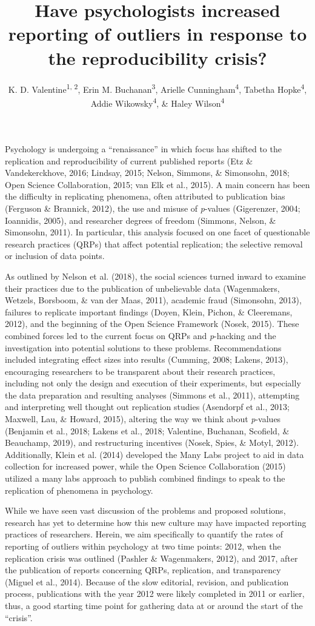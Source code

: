 \documentclass[english,,man,mask]{apa6}
\title{Have psychologists increased reporting of outliers in response to the
reproducibility crisis?}
\author{K. D. Valentine\textsuperscript{1, 2}, Erin M.
Buchanan\textsuperscript{3}, Arielle Cunningham\textsuperscript{4},
Tabetha Hopke\textsuperscript{4}, Addie Wikowsky\textsuperscript{4}, \&
Haley Wilson\textsuperscript{4}}
\date{}
\affiliation{
\vspace{0.5cm}
\textsuperscript{1} Massachusetts General Hospital\\\textsuperscript{2} Harvard Medical School\\\textsuperscript{3} Harrisburg University of Science and Technology\\\textsuperscript{4} Missouri State University}
\theoremstyle{definition}
\theoremstyle{definition}
\theoremstyle{definition}
\theoremstyle{remark}
\begin{document}
\maketitle

Psychology is undergoing a \enquote{renaissance} in which focus has
shifted to the replication and reproducibility of current published
reports (Etz \& Vandekerckhove, 2016; Lindsay, 2015; Nelson, Simmons, \&
Simonsohn, 2018; Open Science Collaboration, 2015; van Elk et al.,
2015). A main concern has been the difficulty in replicating phenomena,
often attributed to publication bias (Ferguson \& Brannick, 2012), the
use and misuse of \emph{p}-values (Gigerenzer, 2004; Ioannidis, 2005),
and researcher degrees of freedom (Simmons, Nelson, \& Simonsohn, 2011).
In particular, this analysis focused on one facet of questionable
research practices (QRPs) that affect potential replication; the
selective removal or inclusion of data points.

As outlined by Nelson et al. (2018), the social sciences turned inward
to examine their practices due to the publication of unbelievable data
(Wagenmakers, Wetzels, Borsboom, \& van der Maas, 2011), academic fraud
(Simonsohn, 2013), failures to replicate important findings (Doyen,
Klein, Pichon, \& Cleeremans, 2012), and the beginning of the Open
Science Framework (Nosek, 2015). These combined forces led to the
current focus on QRPs and \emph{p}-hacking and the investigation into
potential solutions to these problems. Recommendations included
integrating effect sizes into results (Cumming, 2008; Lakens, 2013),
encouraging researchers to be transparent about their research
practices, including not only the design and execution of their
experiments, but especially the data preparation and resulting analyses
(Simmons et al., 2011), attempting and interpreting well thought out
replication studies (Asendorpf et al., 2013; Maxwell, Lau, \& Howard,
2015), altering the way we think about \emph{p}-values (Benjamin et al.,
2018; Lakens et al., 2018; Valentine, Buchanan, Scofield, \& Beauchamp,
2019), and restructuring incentives (Nosek, Spies, \& Motyl, 2012).
Additionally, Klein et al. (2014) developed the Many Labs project to aid
in data collection for increased power, while the Open Science
Collaboration (2015) utilized a many labs approach to publish combined
findings to speak to the replication of phenomena in psychology.

While we have seen vast discussion of the problems and proposed
solutions, research has yet to determine how this new culture may have
impacted reporting practices of researchers. Herein, we aim specifically
to quantify the rates of reporting of outliers within psychology at two
time points: 2012, when the replication crisis was outlined (Pashler \&
Wagenmakers, 2012), and 2017, after the publication of reports
concerning QRPs, replication, and transparency (Miguel et al., 2014).
Because of the slow editorial, revision, and publication process,
publications with the year 2012 were likely completed in 2011 or
earlier, thus, a good starting time point for gathering data at or
around the start of the \enquote{crisis}.
\end{document}
